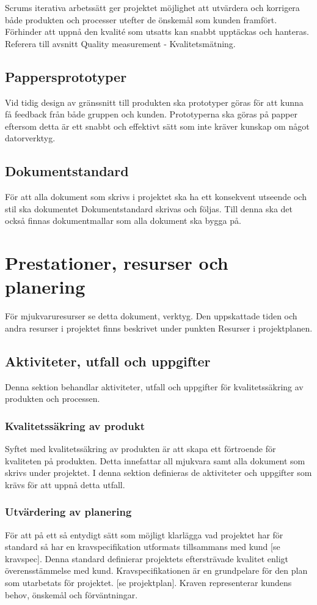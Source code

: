 \documentclass[a4paper,10pt]{article}
\begin{document}
Scrums iterativa arbetssätt ger projektet möjlighet att utvärdera och korrigera både produkten och processer utefter de önskemål som kunden framfört. Förhinder att uppnå den kvalité som utsatts kan snabbt upptäckas och hanteras. Referera till avsnitt Quality measurement - Kvalitetsmätning.

\subsection{Pappersprototyper}
Vid tidig design av gränssnitt till produkten ska prototyper göras för att kunna få feedback från både gruppen och kunden. Prototyperna ska göras på papper eftersom detta är ett snabbt och effektivt sätt som inte kräver kunskap om något datorverktyg.

\subsection{Dokumentstandard}
För att alla dokument som skrivs i projektet ska ha ett konsekvent utseende och stil ska dokumentet Dokumentstandard skrivas och följas. Till denna ska det också finnas dokumentmallar som alla dokument ska bygga på.

\section{Prestationer, resurser och planering}
För mjukvaruresurser se detta dokument, verktyg. 
Den uppskattade tiden och andra resurser i projektet finns beskrivet under punkten Resurser i projektplanen. 

\subsection{Aktiviteter, utfall och uppgifter}
Denna sektion behandlar aktiviteter, utfall och uppgifter för kvalitetssäkring av produkten och processen. 
\subsubsection{Kvalitetssäkring av produkt}
Syftet med kvalitetssäkring av produkten är att skapa ett förtroende för kvaliteten på produkten. Detta innefattar all mjukvara samt alla dokument som skrivs under projektet. I denna sektion definieras de aktiviteter och uppgifter som krävs för att uppnå detta utfall.
\subsubsection{Utvärdering av planering}
För att på ett så entydigt sätt som möjligt klarlägga vad projektet har för standard så har en kravspecifikation utformats tillsammans med kund [se kravspec]. 
Denna standard definierar projektets eftersträvade kvalitet enligt överensstämmelse med kund.
Kravspecifikationen är en grundpelare för den plan som utarbetats för projektet. [se projektplan]. Kraven representerar kundens behov, önskemål och förväntningar. 
\end{document}
